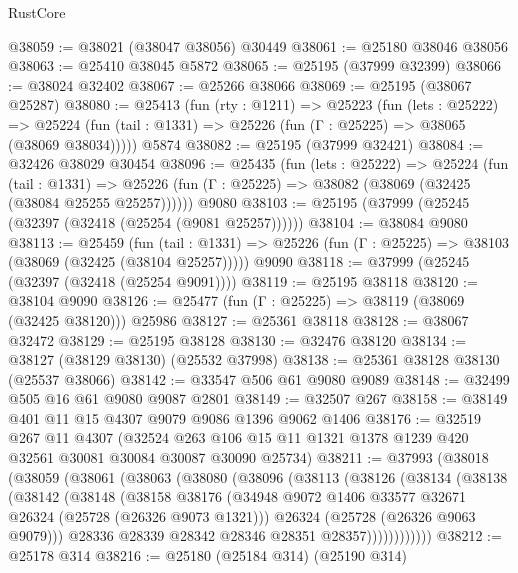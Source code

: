 \begin{lexlean}{RustCore}
\begin{coremodule}
@38059 := @38021 (@38047 @38056) @30449
@38061 := @25180 @38046 @38056
@38063 := @25410 @38045 @5872
@38065 := @25195 (@37999 @32399)
@38066 := @38024 @32402
@38067 := @25266 @38066
@38069 := @25195 (@38067 @25287)
@38080 := @25413
    (fun (rty : @1211) =>
    @25223
      (fun (lets : @25222) =>
      @25224 (fun (tail : @1331) => @25226 (fun (Γ : @25225) => @38065 (@38069 @38034)))))
    @5874
@38082 := @25195 (@37999 @32421)
@38084 := @32426 @38029 @30454
@38096 := @25435
    (fun (lets : @25222) =>
    @25224
      (fun (tail : @1331) =>
      @25226 (fun (Γ : @25225) => @38082 (@38069 (@32425 (@38084 @25255 @25257))))))
    @9080
@38103 := @25195 (@37999 (@25245 (@32397 (@32418 (@25254 (@9081 @25257))))))
@38104 := @38084 @9080
@38113 := @25459
    (fun (tail : @1331) => @25226 (fun (Γ : @25225) => @38103 (@38069 (@32425 (@38104 @25257)))))
    @9090
@38118 := @37999 (@25245 (@32397 (@32418 (@25254 @9091))))
@38119 := @25195 @38118
@38120 := @38104 @9090
@38126 := @25477 (fun (Γ : @25225) => @38119 (@38069 (@32425 @38120))) @25986
@38127 := @25361 @38118
@38128 := @38067 @32472
@38129 := @25195 @38128
@38130 := @32476 @38120
@38134 := @38127 (@38129 @38130) (@25532 @37998)
@38138 := @25361 @38128 @38130 (@25537 @38066)
@38142 := @33547 @506 @61 @9080 @9089
@38148 := @32499 @505 @16 @61 @9080 @9087 @2801
@38149 := @32507 @267
@38158 := @38149 @401 @11 @15 @4307 @9079 @9086 @1396 @9062 @1406
@38176 := @32519
    @267
    @11
    @4307
    (@32524 @263 @106 @15 @11 @1321 @1378 @1239 @420 @32561 @30081 @30084 @30087 @30090 @25734)
@38211 := @37993
    (@38018
      (@38059
        (@38061
          (@38063
            (@38080
              (@38096
                (@38113
                  (@38126
                    (@38134
                      (@38138
                        (@38142
                          (@38148
                            (@38158
                              @38176
                              (@34948
                                @9072
                                @1406
                                @33577
                                @32671
                                @26324
                                (@25728 (@26326 @9073 @1321)))
                              @26324
                              (@25728 (@26326 @9063 @9079)))
                            @28336
                            @28339
                            @28342
                            @28346
                            @28351
                            @28357))))))))))))
@38212 := @25178 @314
@38216 := @25180 (@25184 @314) (@25190 @314)

\end{coremodule}
\end{lexlean}

